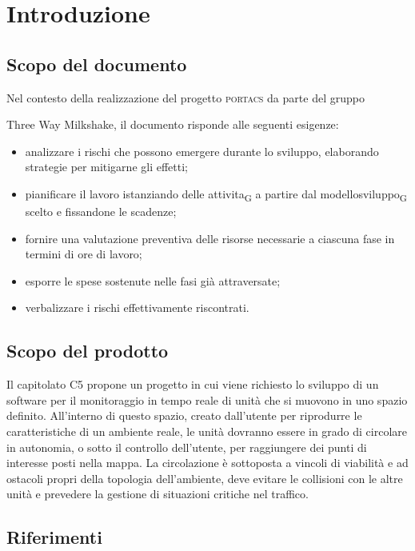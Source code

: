 \section{Introduzione}




\subsection{Scopo del documento}

Nel contesto della realizzazione del progetto \textsc{portacs} da parte del gruppo {Three Way Milkshake, il documento risponde alle seguenti esigenze: 
\begin{itemize}
	\item analizzare i rischi che possono emergere durante lo sviluppo, elaborando strategie per mitigarne gli effetti;
	\item pianificare il lavoro istanziando delle \gls{attivita}\textsubscript{G} a partire dal \gls{modellosviluppo}\textsubscript{G} scelto e fissandone le scadenze;
	\item fornire una valutazione preventiva delle risorse necessarie a ciascuna fase in termini di ore di lavoro;
	\item esporre le spese sostenute nelle fasi già attraversate;
	\item verbalizzare i rischi effettivamente riscontrati.
\end{itemize}



\subsection{Scopo del prodotto}

Il capitolato C5 propone un progetto in cui viene richiesto lo sviluppo di un software per il monitoraggio in tempo reale di unità che si muovono in uno spazio definito. All’interno di questo spazio, creato dall’utente per riprodurre le caratteristiche di un ambiente reale, le unità dovranno essere in grado di circolare in autonomia, o sotto il controllo dell’utente, per raggiungere dei punti di interesse posti nella mappa.  La circolazione è sottoposta a vincoli di viabilità e ad ostacoli propri della topologia dell’ambiente, deve evitare le collisioni con le altre unità e prevedere la gestione di situazioni critiche nel traffico.




\subsection{Riferimenti}



}
